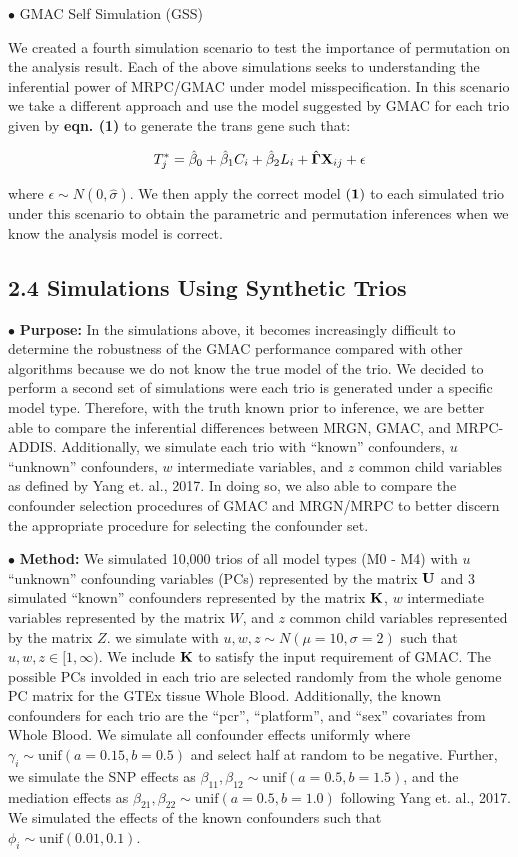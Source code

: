 \documentclass[
]{article}
\begin{document}
\indent \(\bullet\) GMAC Self Simulation (GSS)

We created a fourth simulation scenario to test the importance of
permutation on the analysis result. Each of the above simulations seeks
to understanding the inferential power of MRPC/GMAC under model
misspecification. In this scenario we take a different approach and use
the model suggested by GMAC for each trio given by \textbf{eqn. (1)} to
generate the trans gene such that:

\[ T_j^{\ast} = \hat{\beta}_0 + \hat{\beta}_1 C_i + \hat{\beta}_2 L_i + \hat{{\bf \Gamma}} {\bf X}_{ij} + \epsilon  \]

where \(\epsilon \sim N(0, \hat{\sigma})\). We then apply the correct
model \({\bf (1)}\) to each simulated trio under this scenario to obtain
the parametric and permutation inferences when we know the analysis
model is correct.

\subsection*{2.4 Simulations Using Synthetic Trios}

\indent \(\bullet\) \textbf{Purpose:} In the simulations above, it
becomes increasingly difficult to determine the robustness of the GMAC
performance compared with other algorithms because we do not know the
true model of the trio. We decided to perform a second set of
simulations were each trio is generated under a specific model type.
Therefore, with the truth known prior to inference, we are better able
to compare the inferential differences between MRGN, GMAC, and
MRPC-ADDIS. Additionally, we simulate each trio with ``known''
confounders, \(u\) ``unknown'' confounders, \(w\) intermediate
variables, and \(z\) common child variables as defined by Yang et. al.,
2017. In doing so, we also able to compare the confounder selection
procedures of GMAC and MRGN/MRPC to better discern the appropriate
procedure for selecting the confounder set.

\indent \(\bullet\) \textbf{Method:} We simulated 10,000 trios of all
model types (M0 - M4) with \(u\) ``unknown'' confounding variables (PCs)
represented by the matrix \({\bf U}\) and 3 simulated ``known''
confounders represented by the matrix \({\bf K}\), \(w\) intermediate
variables represented by the matrix \(W\), and \(z\) common child
variables represented by the matrix \(Z\). we simulate with
\(u,w,z \sim N(\mu = 10, \sigma =2)\) such that \(u,w,z\in[1,\infty)\).
We include \({\bf K}\) to satisfy the input requirement of GMAC. The
possible PCs involded in each trio are selected randomly from the whole
genome PC matrix for the GTEx tissue Whole Blood. Additionally, the
known confounders for each trio are the ``pcr'', ``platform'', and
``sex'' covariates from Whole Blood. We simulate all confounder effects
uniformly where \(\gamma_i \sim \text{unif}(a=0.15, b=0.5)\) and select
half at random to be negative. Further, we simulate the SNP effects as
\(\beta_{11}, \beta_{12} \sim \text{unif}(a=0.5, b=1.5)\), and the
mediation effects as
\(\beta_{21}, \beta_{22}\sim\text{unif}(a=0.5,b=1.0)\) following Yang
et. al., 2017. We simulated the effects of the known confounders such
that \(\phi_i\sim \text{unif}(0.01, 0.1)\).
\end{document}
